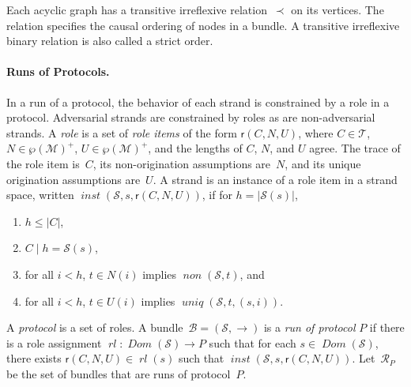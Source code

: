 \documentclass[12pt]{article}
\newcommand{\fn}[1]{\ensuremath{\operatorname{\mathit{#1}}}}
\newcommand{\typ}{\mathbin:}
\newcommand{\sdom}{\fn{Dom}}
\newcommand{\prefix}[2]{#1\mid#2}
\newcommand{\pow}[1]{\wp(#1)}
\newcommand{\msg}{\ensuremath{\mathcal{M}}}
\newcommand{\trc}{\ensuremath{\mathcal{T}}}
\newcommand{\ssp}{\ensuremath{\mathcal{S}}}
\newcommand{\bun}{\ensuremath{\mathcal{B}}}
\newcommand{\run}{\mathcal{R}}
\newcommand{\rl}{\fn{rl}}
\newcommand{\role}{\mathsf{r}}
\begin{document}
Each acyclic graph has a transitive irreflexive
relation~$\prec$ on its vertices.
The relation specifies the causal ordering of nodes in a bundle.  A
transitive irreflexive binary relation is also called a strict order.

\paragraph{Runs of Protocols.}
In a run of a protocol, the behavior of each strand is constrained by
a role in a protocol.  Adversarial strands are constrained by roles as
are non-adversarial strands.  A \emph{role} is a set of
\emph{role items} of the form $\role(C,N,U)$, where $C\in\trc$,
$N\in\pow{\msg}^+$, $U\in\pow{\msg}^+$, and the lengths of $C$,
$N$, and $U$ agree.  The trace of the role item is~$C$, its
non-origination assumptions are~$N$, and its unique origination
assumptions are~$U$.  A strand is an instance of a role item in a
strand space, written $\fn{inst}(\ssp,s,\role(C,N,U))$, if for
$h=|\ssp(s)|$,
\begin{enumerate}
\item $h\leq|C|$,
\item $\prefix{C}{h}=\ssp(s)$,
\item for all $i<h$, $t\in N(i)$ implies $\fn{non}(\ssp,t)$, and
\item for all $i<h$, $t\in U(i)$ implies $\fn{uniq}(\ssp,t,(s,i))$.
\end{enumerate}

A \emph{protocol} is a set of roles.  A
bundle~$\bun=(\ssp,\to)$ is a \emph{run of
  protocol} $P$ if there is a role assignment
$\rl\typ\sdom(\ssp)\to P$ such that for each $s\in\sdom(\ssp)$,
there exists $\role(C,N,U)\in\rl(s)$ such that
\index{inst@\fn{inst}}$\fn{inst}(\ssp,s,\role(C,N,U))$.  Let~$\run_P$ be
the set of bundles that are runs of protocol~$P$.



\end{document}
